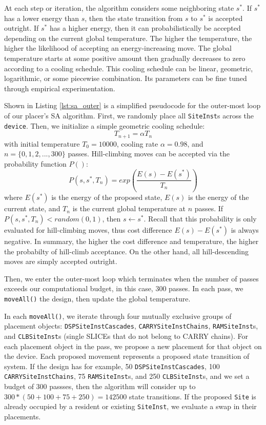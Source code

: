 At each step or iteration, the algorithm considers some neighboring state \(s^*\). 
If \(s^*\) has a lower energy than \(s\), then the state transition from \(s\) to \(s^*\) is accepted outright.
If \(s^*\) has a higher energy, then it can probabilistically be accepted depending on the current global temperature.
The higher the temperature, the higher the likelihood of accepting an energy-increasing move. 
The global temperature starts at some positive amount then gradually decreases to zero according to a cooling schedule.
This cooling schedule can be linear, geometric, logarithmic, or some piecewise combination. 
Its parameters can be fine tuned through empirical experimentation. 

Shown in Listing \ref{lst:sa_outer} is a simplified pseudocode for the outer-most loop of our placer's SA algorithm. 
First, we randomly place all \texttt{SiteInst}s across the \texttt{device}.
Then, we initialize a simple geometric cooling schedule: 
\begin{equation}
    \label{coolingSchedule}
    T_{n+1} = \alpha T_n
\end{equation}
with initial temperature \(T_0=10000\), cooling rate \(\alpha=0.98\), and \(n = \{0, 1, 2, ..., 300\}\) passes.
Hill-climbing moves can be accepted via the probability function \(P()\): 
\begin{equation}
    \label{moveAcceptance}
    P(s, s^*, T_n) = exp(\frac{E(s) - E(s^*)}{T_n})
\end{equation}
where \(E(s^*)\) is the energy of the proposed state, \(E(s)\) is the energy of the current state, and \(T_n\) is the current global temperature at \(n\) passes. 
If \(P(s, s^*, T_n) < random(0, 1)\), then \(s \leftarrow s^*\).
Recall that this probability is only evaluated for hill-climbing moves, thus cost difference \(E(s) - E(s^*)\) is always negative.
In summary, the higher the cost difference and temperature, the higher the probabilty of hill-climb acceptance.
On the other hand, all hill-descending moves are simply accepted outright. 


Then, we enter the outer-most loop which terminates when the number of passes exceeds our computational budget, in this case, 300 passes. 
In each pass, we \texttt{moveAll()} the design, then update the global temperature. 

In each \texttt{moveAll()}, we iterate through four mutually exclusive groups of placement objects: \texttt{DSPSiteInstCascades}, \texttt{CARRYSiteInstChains}, \texttt{RAMSiteInst}s, and \texttt{CLBSiteInst}s (single SLICEs that do not belong to CARRY chains).
For each placement object in the pass, we propose a new placement for that object on the device. 
Each proposed movement represents a proposed state transition of system. 
If the design has for example, 50 \texttt{DSPSiteInstCascades}, 100 \texttt{CARRYSiteInstChains}, 75 \texttt{RAMSiteInst}s, and 250 \texttt{CLBSiteInst}s, and we set a budget of 300 passses, then the algorithm will consider up to \(300 * (50 + 100 + 75 + 250) = 142500\) state transitions. 
If the proposed \texttt{Site} is already occupied by a resident or existing \texttt{SiteInst}, we evaluate a swap in their placements. 

